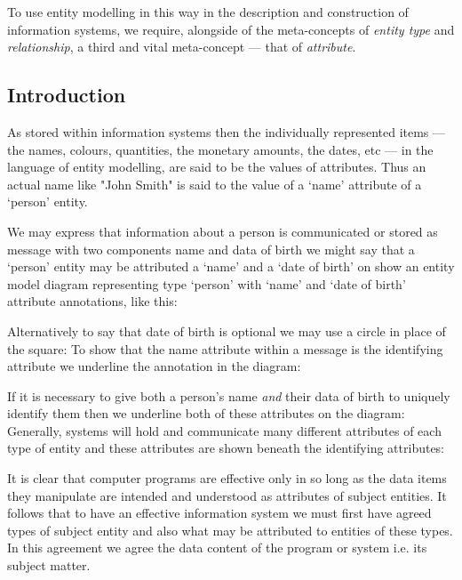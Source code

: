 \begin{reinstatet}

\end{reinstatet}

\mynote 
To use entity modelling in this way in the description and construction of information systems, 
we require, alongside of the meta-concepts of \textit{entity type} and \textit{relationship}, a
third and vital meta-concept — that of \textit{attribute}. 

\subsection{Introduction}
\mynote  As stored within information systems then the individually represented items — the 
names, colours, quantities, the monetary amounts, the dates, etc — in the language 
of entity modelling, are said to be the values of attributes. Thus an actual name 
like "John Smith" is said to the value of a ‘name’ attribute of a ‘person’ entity.

We may express that information about a person is communicated or stored as 
message with two components name and data of birth we might say that a ‘person’ entity may be attributed a ‘name’ and a ‘date of birth’ 
on show an entity model diagram representing type ‘person’
with ‘name’ and ‘date of birth’ attribute annotations, like this:

\mynote Alternatively to say 
that date of birth is optional
we may use a circle in place of the square:
To show that the name attribute within a message is the identifying attribute we underline the annotation in the diagram: 	

\mynote 
If it is necessary to give both a person's name \textit{and} their data of birth to uniquely identify 
them  then we underline
both of these attributes on the diagram:
Generally, systems will hold and communicate many different attributes of each type of entity and
these attributes are shown beneath the identifying attributes:

\mynote 
It is clear that computer programs are effective only in so long as the data items 
they manipulate are intended and understood as attributes of subject entities. It 
follows that to have an effective information system we must first have agreed types 
of subject entity and also what may be attributed to entities  of these types. In this agreement we agree the data content of the program or system i.e.  
its subject matter.

